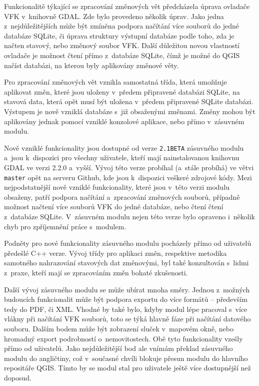\documentclass[a4paper,12pt,oneside]{book}
\begin{document}
Funkcionalitě týkající se zpracování změnových vět předcházela úprava
ovladače VFK v~knihovně GDAL. Zde bylo provedeno několik úprav. Jako
jedna z~nejdůležitějších může být zmíněna podpora načítání více
souborů do jedné databáze SQLite, či úprava struktury výstupní
databáze podle toho, zda je načten stavový, nebo změnový soubor
VFK. Další důležitou novou vlastností ovladače je možnost čtení přímo
z~databáze SQLite, čímž je možné do QGIS načíst databázi, na kterou
byly aplikovány změnové věty.

Pro zpracování změnových vět vznikla samostatná třída, která umožňuje
aplikovat změn, které jsou uloženy v~předem připravené databázi
SQLite, na stavová data, která opět musí být uložena v~předem
připravené SQLite databázi. Výstupem je nově vzniklá databáze s~již
obsaženými změnami. Změny mohou být aplikovány jednak pomocí vzniklé
konzolové aplikace, nebo přímo v~zásuvném modulu.

Nově vzniklé funkcionality jsou dostupné od verze \texttt{2.1BETA}
zásuvného modulu a~jsou k~dispozici pro všechny uživatele, kteří mají
nainstalovanou knihovnu GDAL ve verzi 2.2.0 a~vyšší. Vývoj této verze
probíhal (a~stále probíhá) ve větvi \texttt{master} opět na serveru
Github, kde jsou k~dispozici veškeré zdrojové kódy. Mezi
nejpodstatnější nově vzniklé funkcionality, které jsou v~této verzi
modulu obsaženy, patří podpora načítání a~zpracování změnových
souborů, případně možnost načtení více souborů VFK do jedné databáze,
nebo čtení čtení z~databáze SQLite. V~zásuvném modulu nejen této verze
bylo opraveno i~několik chyb pro zpříjemnění práce s~modulem.

Podněty pro nové funkcionality zásuvného modulu pocházely přímo od
uživatelů předešlé C++ verze. Vývoj třídy pro aplikaci změn,
respektive metodika samotného nahrazování stavových dat změnovými, byl
také konzultován s~lidmi z~praxe, kteří mají se zpracováním změn
bohaté zkušenosti.

Další vývoj zásuvného modulu se může ubírat mnoha směry. Jednou
z~možných budoucích funkcionalit může být podpora exportu do více
formátů -- především tedy do PDF, či XML. Vhodné by také bylo, kdyby
modul lépe pracoval s~více vlákny při načítání VFK souborů, toto se
týká hlavně fáze při načítání datového souboru. Dalším bodem může být
zobrazení sluček v~mapovém okně, nebo hromadný export podrobností
o~nemovitostech. Obě tyto funkcionality vzešly přímo od
uživatelů. Jako nejdůležitější bod ale vnímám překlad zásuvného modulu
do angličtiny, což v~současné chvíli blokuje přesun modulu do hlavního
repositáře QGIS. Tímto by se modul stal pro uživatele ještě více
dostupnější než doposud.
\end{document}
